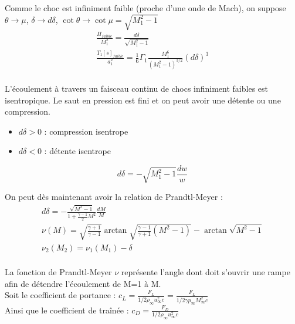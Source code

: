\documentclass[../main.tex]{subfiles}
\begin{document}
Comme le choc est infiniment faible (proche d'une onde de Mach), on suppose $\theta \rightarrow \mu$, $\delta \rightarrow d\delta$, $\cot \theta \rightarrow \cot \mu = \sqrt{M_1^2-1}$\\

\begin{equation} \begin{gathered}
    \frac{\Pi_{faible}}{M_1^2} = \frac{d\delta}{\sqrt{M_1^2-1}}\\
    \frac{T_1[s]_{faible}}{a_1^2} = \frac{1}{6} \Gamma_1 \frac{M_1^6}{(M_1^2-1)^{3/2}} (d\delta)^3\\
    \end{gathered}
\end{equation}

\warning L'écoulement à travers un faisceau continu de chocs infiniment faibles est isentropique. Le saut en pression est fini et on peut avoir une détente ou une compression.\\

\begin{itemize}
    \item $d\delta >0$ : compression isentrope\\
    \item $d\delta < 0$ : détente isentrope\\
\end{itemize}

\begin{equation}
    d\delta = -\sqrt{M_1^2-1} \frac{dw}{w}
\end{equation}

On peut dès maintenant avoir la relation de Prandtl-Meyer : \begin{equation} \begin{gathered}
    d\delta = -\frac{\sqrt{M^2-1}}{1+\frac{\gamma-1}{2}M^2} \frac{dM}{M}\\
    \nu(M) = \sqrt{\frac{\gamma+1}{\gamma-1}} \arctan \sqrt{\frac{\gamma-1}{\gamma+1}(M^2-1)} - \arctan \sqrt{M^2-1}\\
    \nu_2(M_2) = \nu_1(M_1) - \delta\\
    \end{gathered}
\end{equation}

La fonction de Prandtl-Meyer $\nu$ représente l'angle dont doit s'ouvrir une rampe afin de détendre l'écoulement de M=1 à M.\\

Soit le coefficient de portance : $c_L = \frac{F_L}{1/2 \rho_\infty u_\infty^2 c} = \frac{F_L}{1/2  \gamma p_\infty M_\infty^2 c}$\\
Ainsi que le coefficient de traînée : $c_D = \frac{F_D}{1/2 \rho_\infty u_\infty^2 c}$\\
\end{document}
